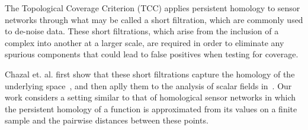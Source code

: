 The Topological Coverage Criterion (TCC) applies persistent homology to sensor networks through what may be called a short filtration, which are commonly used to de-noise data.
These short filtrations, which arise from the inclusion of a complex into another at a larger scale, are required in order to eliminate any spurious components that could lead to false positives when testing for coverage.


Chazal et. al. first show that these short filtrations capture the homology of the underlying space~\cite{chazal08towards}, and then aplly them to the analysis of scalar fields in~\cite{chazal09analysis}.
Our work considers a setting similar to that of homological sensor networks in which the persistent homology of a function is approximated from its values on a finite sample and the pairwise distances between these points.


